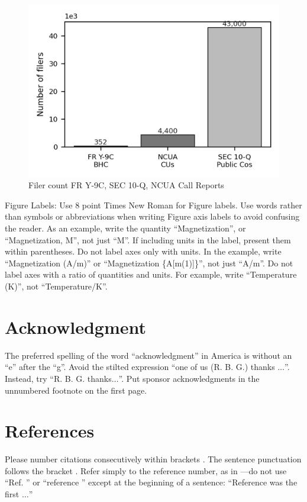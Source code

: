 \documentclass[conference]{IEEEtran}
\begin{document}
\begin{figure}[htbp]
\centerline{\includegraphics{9C Vs 10-Q Vs NCUA Grayscale.png}}
\caption{Filer count FR Y-9C, SEC 10-Q, NCUA Call Reports}
\label{fig}
\end{figure}

Figure Labels: Use 8 point Times New Roman for Figure labels. Use words 
rather than symbols or abbreviations when writing Figure axis labels to 
avoid confusing the reader. As an example, write the quantity 
``Magnetization'', or ``Magnetization, M'', not just ``M''. If including 
units in the label, present them within parentheses. Do not label axes only 
with units. In the example, write ``Magnetization (A/m)'' or ``Magnetization 
\{A[m(1)]\}'', not just ``A/m''. Do not label axes with a ratio of 
quantities and units. For example, write ``Temperature (K)'', not 
``Temperature/K''.

\section*{Acknowledgment}

The preferred spelling of the word ``acknowledgment'' in America is without 
an ``e'' after the ``g''. Avoid the stilted expression ``one of us (R. B. 
G.) thanks $\ldots$''. Instead, try ``R. B. G. thanks$\ldots$''. Put sponsor 
acknowledgments in the unnumbered footnote on the first page.

\section*{References}

Please number citations consecutively within brackets \cite{b1}. The 
sentence punctuation follows the bracket \cite{b2}. Refer simply to the reference 
number, as in \cite{b3}---do not use ``Ref. \cite{b3}'' or ``reference \cite{b3}'' except at 
the beginning of a sentence: ``Reference \cite{b3} was the first $\ldots$''
\end{document}
